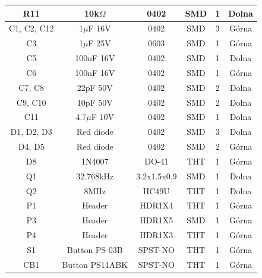 \documentclass[12pt, twoside]{article} %
\numberwithin{equation}{subsection}
\numberwithin{figure}{section}
\numberwithin{table}{section}
\begin{document}
\begin{table}[!h]
\begin{tabular}{|c|c|c|c|c|c|}
R11                 & 10k$\Omega$                   & 0402             & SMD             & 1              & Dolna            \\ \hline
C1, C2, C12         & 1$\mu$F 16V                & 0402             & SMD             & 3              & Górna            \\ \hline
C3                  & 1$\mu$F 25V                & 0603             & SMD             & 1              & Górna            \\ \hline
C5                  & 100nF 16V              & 0402             & SMD             & 1              & Dolna            \\ \hline
C6                  & 100nF 16V              & 0402             & SMD             & 1              & Górna            \\ \hline
C7, C8              & 22pF 50V               & 0402             & SMD             & 2              & Dolna            \\ \hline
C9, C10             & 10pF 50V               & 0402             & SMD             & 2              & Dolna            \\ \hline
C11                 & 4.7$\mu$F 10V              & 0402             & SMD             & 1              & Dolna            \\ \hline
D1, D2, D3          & Red diode              & 0402             & SMD             & 3              & Dolna            \\ \hline
D4, D5              & Red diode              & 0402             & SMD             & 2              & Górna            \\ \hline
D8                  & 1N4007                 & DO-41            & THT             & 1              & Górna            \\ \hline
Q1                  & 32.768kHz              & 3.2x1.5x0.9    & SMD             & 1              & Dolna            \\ \hline
Q2                  & 8MHz                   & HC49U            & THT             & 1              & Dolna            \\ \hline
P1                  & Header                 & HDR1X4           & THT             & 1              & Górna            \\ \hline
P3                  & Header                 & HDR1X5           & SMD             & 1              & Górna            \\ \hline
P4                  & Header                 & HDR1X3           & THT             & 1              & Górna            \\ \hline
S1                  & Button PS-03B          & SPST-NO          & THT             & 1              & Górna            \\ \hline
CB1                 & Button PS11ABK         & SPST-NO          & THT             & 1              & Górna            \\ \hline
\end{tabular}
\end{table}
\end{document}
